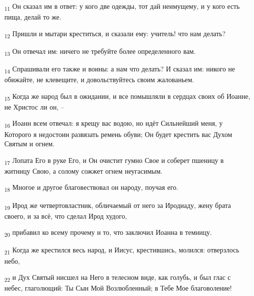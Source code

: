 \begin{tcolorbox}
\textsubscript{11} Он сказал им в ответ: у кого две одежды, тот дай неимущему, и у кого есть пища, делай то же.
\end{tcolorbox}
\begin{tcolorbox}
\textsubscript{12} Пришли и мытари креститься, и сказали ему: учитель! что нам делать?
\end{tcolorbox}
\begin{tcolorbox}
\textsubscript{13} Он отвечал им: ничего не требуйте более определенного вам.
\end{tcolorbox}
\begin{tcolorbox}
\textsubscript{14} Спрашивали его также и воины: а нам что делать? И сказал им: никого не обижайте, не клевещите, и довольствуйтесь своим жалованьем.
\end{tcolorbox}
\begin{tcolorbox}
\textsubscript{15} Когда же народ был в ожидании, и все помышляли в сердцах своих об Иоанне, не Христос ли он, --
\end{tcolorbox}
\begin{tcolorbox}
\textsubscript{16} Иоанн всем отвечал: я крещу вас водою, но идёт Сильнейший меня, у Которого я недостоин развязать ремень обуви; Он будет крестить вас Духом Святым и огнем.
\end{tcolorbox}
\begin{tcolorbox}
\textsubscript{17} Лопата Его в руке Его, и Он очистит гумно Свое и соберет пшеницу в житницу Свою, а солому сожжет огнем неугасимым.
\end{tcolorbox}
\begin{tcolorbox}
\textsubscript{18} Многое и другое благовествовал он народу, поучая его.
\end{tcolorbox}
\begin{tcolorbox}
\textsubscript{19} Ирод же четвертовластник, обличаемый от него за Иродиаду, жену брата своего, и за всё, что сделал Ирод худого,
\end{tcolorbox}
\begin{tcolorbox}
\textsubscript{20} прибавил ко всему прочему и то, что заключил Иоанна в темницу.
\end{tcolorbox}
\begin{tcolorbox}
\textsubscript{21} Когда же крестился весь народ, и Иисус, крестившись, молился: отверзлось небо,
\end{tcolorbox}
\begin{tcolorbox}
\textsubscript{22} и Дух Святый нисшел на Него в телесном виде, как голубь, и был глас с небес, глаголющий: Ты Сын Мой Возлюбленный; в Тебе Мое благоволение!
\end{tcolorbox}
